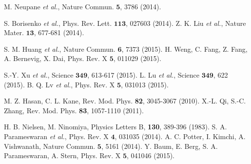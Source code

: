 \documentclass[aps,prl,superscriptaddress,twocolumn,showpacs]{revtex4-1}
\begin{document}
\begin{thebibliography}{99}

 M. Neupane \textit{et al.}, Nature Commun. $\mathbf{5}$, 3786 (2014).


 S. Borisenko \textit{et al.}, Phys. Rev. Lett. $\mathbf{113}$, 027603 (2014).
 Z. K. Liu \textit{et al.}, Nature Mater. $\mathbf{13}$, 677-681 (2014).


 S. M. Huang \textit{et al.},  Nature Commun. $\mathbf{6}$, 7373 (2015).
 H. Weng, C.  Fang, Z. Fang,  A. Bernevig, X. Dai, Phys. Rev. X $\mathbf{5}$, 011029 (2015).

 S.-Y. Xu \textit{et al.},  Science $\mathbf{349}$, 613-617 (2015).
 L. Lu  \textit{et al.}, Science $\mathbf{349}$, 622 (2015).
 B. Q. Lv \textit{et al.},  Phys. Rev. X $\mathbf{5}$, 031013 (2015).

 M. Z. Hasan,  C. L. Kane,   Rev. Mod. Phys. \textbf{82}, 3045-3067 (2010).
 X.-L. Qi,   S.-C. Zhang,   Rev. Mod. Phys. \textbf{83}, 1057-1110 (2011).



 H. B. Nielsen, M. Ninomiya, Physics Letters B, \textbf{130}, 389-396 (1983).
 S. A. Parameswaran \textit{et al.}, Phys. Rev. X $\mathbf{4}$, 031035 (2014).
 A. C. Potter, I. Kimchi,   A. Vishwanath, Nature Commun. $\mathbf{5}$, 5161 (2014).
 Y. Baum, E. Berg, S. A. Parameswaran, A. Stern, Phys. Rev. X $\mathbf{5}$, 041046 (2015).


\end{thebibliography}
\end{document}
